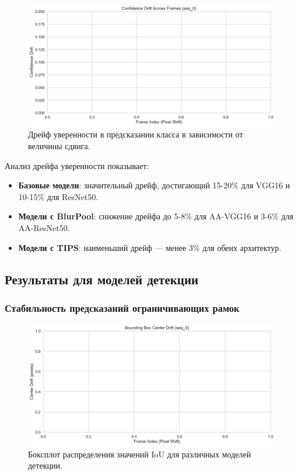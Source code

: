 \begin{figure}[ht]
\centering
\includegraphics[width=\textwidth]{images/classification/confidence_drift_comparison_seq_0.png}
\caption{Дрейф уверенности в предсказании класса в зависимости от величины сдвига.}
\label{fig:confidence_drift}
\end{figure}

Анализ дрейфа уверенности показывает:

\begin{itemize}
    \item \textbf{Базовые модели}: значительный дрейф, достигающий 15-20\% для VGG16 и 10-15\% для ResNet50.
    \item \textbf{Модели с BlurPool}: снижение дрейфа до 5-8\% для AA-VGG16 и 3-6\% для AA-ResNet50.
    \item \textbf{Модели с TIPS}: наименьший дрейф — менее 3\% для обеих архитектур.
\end{itemize}

\subsection{Результаты для моделей детекции}
\label{sec:experiments:detection}

\subsubsection{Стабильность предсказаний ограничивающих рамок}
\label{sec:experiments:detection:bbox}

\begin{figure}[ht]
\centering
\includegraphics[width=\textwidth]{images/detection/center_drift_comparison_seq_0.png}
\caption{Боксплот распределения значений IoU для различных моделей детекции.}
\label{fig:boxplot_iou}
\end{figure}

